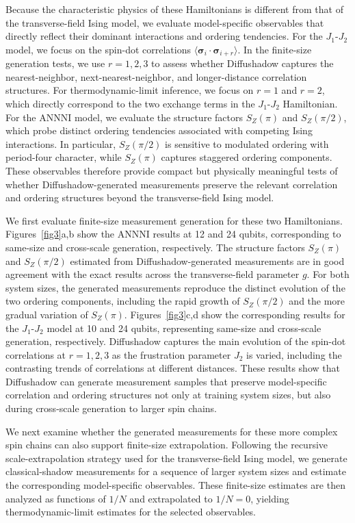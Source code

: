 \documentclass[pdflatex,sn-mathphys-num]{sn-jnl}%
\theoremstyle{thmstyleone}%
\theoremstyle{thmstyletwo}%
\theoremstyle{thmstylethree}%
\begin{document}
Because the characteristic physics of these Hamiltonians is different from that of the transverse-field Ising model, we evaluate model-specific observables that directly reflect their dominant interactions and ordering tendencies. For the \(J_1\)-\(J_2\) model, we focus on the spin-dot correlations
\(\langle \boldsymbol{\sigma}_i \cdot \boldsymbol{\sigma}_{i+r} \rangle\). In the finite-size generation tests, we use \(r=1,2,3\) to assess whether Diffushadow captures the nearest-neighbor, next-nearest-neighbor, and longer-distance correlation structures. For thermodynamic-limit inference, we focus on \(r=1\) and \(r=2\), which directly correspond to the two exchange terms in the \(J_1\)-\(J_2\) Hamiltonian. For the ANNNI model, we evaluate the structure factors \(S_Z(\pi)\) and \(S_Z(\pi/2)\), which probe distinct ordering tendencies associated with competing Ising interactions. In particular, \(S_Z(\pi/2)\) is sensitive to modulated ordering with period-four character, while \(S_Z(\pi)\) captures staggered ordering components. These observables therefore provide compact but physically meaningful tests of whether Diffushadow-generated measurements preserve the relevant correlation and ordering structures beyond the transverse-field Ising model.

We first evaluate finite-size measurement generation for these two Hamiltonians. Figures~\ref{fig3}a,b show the ANNNI results at 12 and 24 qubits, corresponding to same-size and cross-scale generation, respectively. The structure factors \(S_Z(\pi)\) and \(S_Z(\pi/2)\) estimated from Diffushadow-generated measurements are in good agreement with the exact results across the transverse-field parameter \(g\). For both system sizes, the generated measurements reproduce the distinct evolution of the two ordering components, including the rapid growth of \(S_Z(\pi/2)\) and the more gradual variation of \(S_Z(\pi)\). Figures~\ref{fig3}c,d show the corresponding results for the \(J_1\)-\(J_2\) model at 10 and 24 qubits, representing same-size and cross-scale generation, respectively. Diffushadow captures the main evolution of the spin-dot correlations at \(r=1,2,3\) as the frustration parameter \(J_2\) is varied, including the contrasting trends of correlations at different distances. These results show that Diffushadow can generate measurement samples that preserve model-specific correlation and ordering structures not only at training system sizes, but also during cross-scale generation to larger spin chains.


We next examine whether the generated measurements for these more complex spin chains can also support finite-size extrapolation. Following the recursive scale-extrapolation strategy used for the transverse-field Ising model, we generate classical-shadow measurements for a sequence of larger system sizes and estimate the corresponding model-specific observables. These finite-size estimates are then analyzed as functions of \(1/N\) and extrapolated to \(1/N=0\), yielding thermodynamic-limit estimates for the selected observables.
\end{document}
